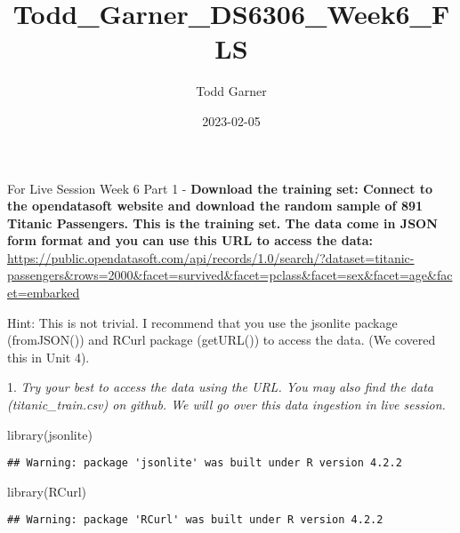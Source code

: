\documentclass[
  ignorenonframetext,
]{beamer}
\title{Todd\_Garner\_DS6306\_Week6\_FLS}
\author{Todd Garner}
\date{2023-02-05}
\newenvironment{Shaded}{\begin{snugshade}}{\end{snugshade}}
\newcommand{\AttributeTok}[1]{\textcolor[rgb]{0.77,0.63,0.00}{#1}}
\newcommand{\CommentTok}[1]{\textcolor[rgb]{0.56,0.35,0.01}{\textit{#1}}}
\newcommand{\ConstantTok}[1]{\textcolor[rgb]{0.00,0.00,0.00}{#1}}
\newcommand{\FunctionTok}[1]{\textcolor[rgb]{0.00,0.00,0.00}{#1}}
\newcommand{\NormalTok}[1]{#1}
\newcommand{\OtherTok}[1]{\textcolor[rgb]{0.56,0.35,0.01}{#1}}
\begin{document}
\frame{\titlepage}

\begin{frame}[fragile]{For Live Session Week 6 Part 1 - \textbf{Download
the training set: Connect to the opendatasoft website and download the
random sample of 891 Titanic Passengers. This is the training set. The
data come in JSON form format and you can use this URL to access the
data:}}
\protect\hypertarget{for-live-session-week-6-part-1---download-the-training-set-connect-to-the-opendatasoft-website-and-download-the-random-sample-of-891-titanic-passengers.-this-is-the-training-set.-the-data-come-in-json-form-format-and-you-can-use-this-url-to-access-the-data}{}
\url{https://public.opendatasoft.com/api/records/1.0/search/?dataset=titanic-passengers\&rows=2000\&facet=survived\&facet=pclass\&facet=sex\&facet=age\&facet=embarked}

Hint: This is not trivial. I recommend that you use the jsonlite package
(fromJSON()) and RCurl package (getURL()) to access the data. (We
covered this in Unit 4).

\begin{block}{1. \emph{Try your best to access the data using the URL.
You may also find the data (titanic\_train.csv) on github. We will go
over this data ingestion in live session.}}
\protect\hypertarget{try-your-best-to-access-the-data-using-the-url.-you-may-also-find-the-data-titanic_train.csv-on-github.-we-will-go-over-this-data-ingestion-in-live-session.}{}
\begin{Shaded}
\begin{Highlighting}[]
\FunctionTok{library}\NormalTok{(jsonlite)}
\end{Highlighting}
\end{Shaded}

\begin{verbatim}
## Warning: package 'jsonlite' was built under R version 4.2.2
\end{verbatim}

\begin{Shaded}
\begin{Highlighting}[]
\FunctionTok{library}\NormalTok{(RCurl)}
\end{Highlighting}
\end{Shaded}

\begin{verbatim}
## Warning: package 'RCurl' was built under R version 4.2.2
\end{verbatim}

\begin{Shaded}
\end{Shaded}


\end{block}
\end{frame}
\end{document}
